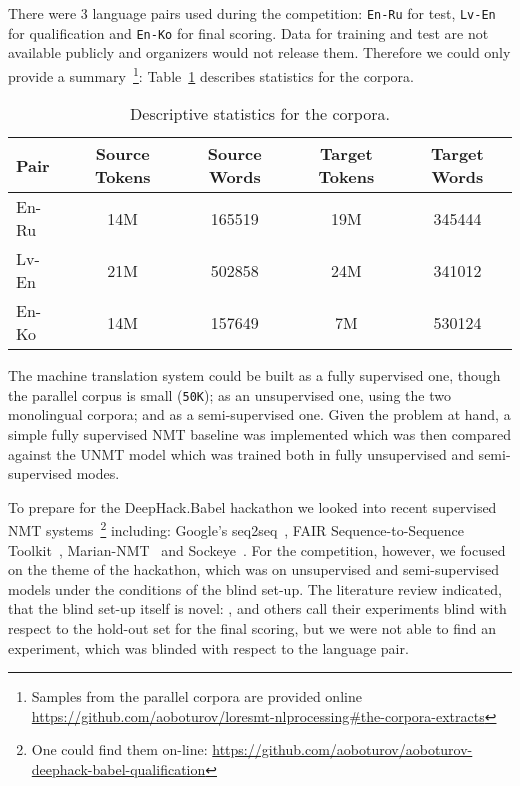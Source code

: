 \documentclass[]{article}
\begin{document}
There were 3 language pairs used during the competition: {\tt En-Ru} for test, {\tt Lv-En} for qualification and {\tt En-Ko} for final scoring.
Data for training and test are not available publicly and organizers would not release them.
Therefore we could only provide a summary~\footnote{Samples from the parallel corpora are provided online \url{https://github.com/aoboturov/loresmt-nlprocessing\#the-corpora-extracts}}: Table~\ref{table:corpora_stats} describes statistics for the corpora.

\begin{table}[h!]
\begin{center}
\begin{tabular}{ l c c c c }
Pair & Source Tokens & Source Words & Target Tokens & Target Words \\
\hline
En-Ru & 14M & 165519 & 19M & 345444 \\
Lv-En & 21M & 502858 & 24M & 341012 \\
En-Ko & 14M & 157649 & 7M & 530124 \\
\end{tabular}
\end{center}
\caption{Descriptive statistics for the corpora.}
\label{table:corpora_stats}
\end{table}

The machine translation system could be built as a fully supervised one, though the parallel corpus is small ({\tt 50K}); as an unsupervised one, using the two monolingual corpora; and as a semi-supervised one.
Given the problem at hand, a simple fully supervised \ac{NMT} baseline was implemented which was then compared against the \ac{UNMT} model which was trained both in fully unsupervised and semi-supervised modes.

To prepare for the {{DeepHack.Babel}} hackathon we looked into recent supervised \ac{NMT} systems~\footnote{One could find them on-line: \url{https://github.com/aoboturov/aoboturov-deephack-babel-qualification}} including: Google's seq2seq~\citep{Britz:2017}, {FAIR Sequence-to-Sequence Toolkit}~\citep{gehring2017convs2s}, {{Marian-NMT}}~\citep{junczys2016neural} and Sockeye~\citep{Sockeye:17}.
For the competition, however, we focused on the theme of the hackathon, which was on unsupervised and semi-supervised models under the conditions of the blind set-up.
The literature review indicated, that the blind set-up itself is novel: \citep{och2004smorgasbord}, \citep{tillmann2004unigram} and others call their experiments blind with respect to the hold-out set for the final scoring, but we were not able to find an experiment, which was blinded with respect to the language pair.
\end{document}
